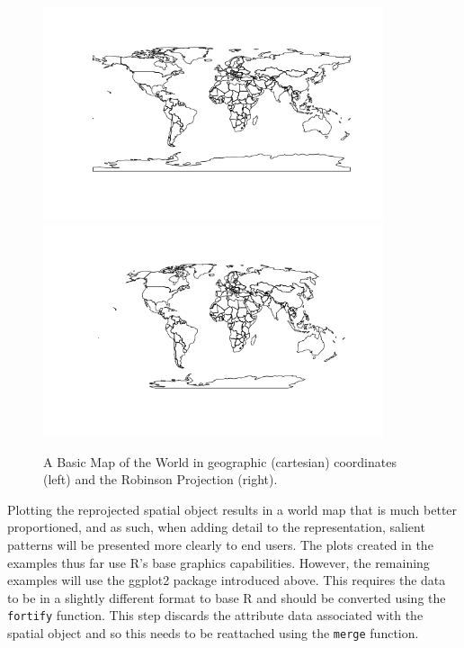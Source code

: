 \documentclass[]{article}
\let\Oldincludegraphics\includegraphics
\renewcommand{\includegraphics}[1]{\Oldincludegraphics[width=10cm]{#1}}
\begin{document}
\begin{figure}[htbp]
\includegraphics{figure/A_Basic_Map_of_the_World.png}
\includegraphics{figure/The_Robinson_Projection.png} 
\caption{A Basic Map of the World in geographic (cartesian) coordinates (left) and the Robinson Projection (right).}
\label{frobmap}
\end{figure}

Plotting the reprojected spatial object results in a world map that is much better proportioned, and as such, when 
adding detail to the representation, salient patterns will be presented more clearly to end users. The
plots created in the examples thus far use R's base graphics capabilities. However, the remaining examples will use the ggplot2
package introduced above. This requires the data to be in a slightly different format to base R and should be converted using the \texttt{fortify} function. This step discards the attribute data associated with the spatial object and so this needs to be reattached using the \texttt{merge} function.
\end{document}

